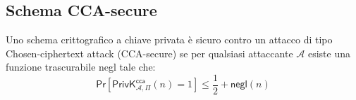 \subsection{Schema CCA-secure}
Uno schema crittografico a chiave privata è sicuro contro un attacco di tipo Chosen-ciphertext attack (CCA-secure) se per qualsiasi attaccante $\mathcal{A}$ esiste una funzione trascurabile negl tale che: \\
$$
    \mathsf{Pr}[\mathsf{PrivK}^{\mathsf{cca}}_{\mathcal{A},\Pi}(n) = 1] \leq \frac{1}{2} + \mathsf{negl}(n)
$$
